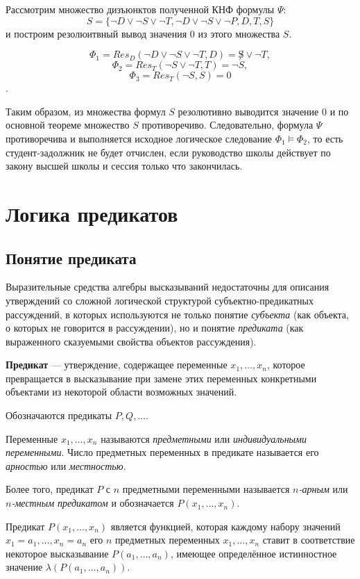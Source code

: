 Рассмотрим множество дизъюнктов полученной КНФ формулы $\Psi$:
$$S = \{\lnot D \lor \lnot S \lor \lnot T, \lnot D \lor \lnot S \lor \lnot P, D, T, S\}$$
и построим резолюитвный вывод значения 0 из этого множества $S$.

$$\Phi_1 = Res_D(\lnot D \lor \lnot S \lor \lnot T, D) = \not S \lor \lnot T,$$
$$\Phi_2 = Res_T(\lnot S \lor \lnot T, T) = \lnot S,$$
$$\Phi_3 = Res_T(\lnot S, S) = 0$$.

Таким образом, из множества формул $S$ резолютивно выводится значение 0 и по основной теореме множество $S$ противоречиво. Следовательно, формула $\Psi$ противоречива и выполняется исходное логическое следование $\Phi_1 \vDash \Phi_2$, то есть студент-задолжник не будет отчислен, если руководство школы действует по закону высшей школы и сессия только что закончилась.

\section{Логика предикатов}
\subsection{Понятие предиката}
Выразительные средства алгебры высказываний недостаточны для описания утверждений со сложной логической структурой субъектно-предикатных рассуждений, в которых используются не только понятие \textit{субъекта} (как объекта, о которых не говорится в рассуждении), но и понятие \textit{предиката} (как выраженного сказуемыми свойства объектов рассуждения).

\dftion \textbf{Предикат} --- утверждение, содержащее переменные $x_1,\dots,x_n$, которое превращается в высказывание при замене этих переменных конкретными объектами из некоторой области возможных значений.

Обозначаются предикаты $P, Q, \dots$.

Переменные $x_1, \dots, x_n$ называются \textit{предметными} или \textit{индивидуальными переменными}. Число предметных переменных в предикате называется его \textit{арностью} или \textit{местностью}.

Более того, предикат $P$ с $n$ предметными переменными называется \textit{$n$-арным} или \textit{$n$-местным предикатом} и обозначается $P(x_1, \dots, x_n)$.

Предикат $P(x_1,\dots,x_n)$ является функцией, которая каждому набору значений $x_1 = a_1, \dots, x_n = a_n$ его $n$ предметных переменных $x_1, \dots, x_n$ ставит в соответствие некоторое высказывание $P(a_1, \dots, a_n)$, имеющее определённое истинностное значение $\lambda(P(a_1, \dots, a_n))$.

